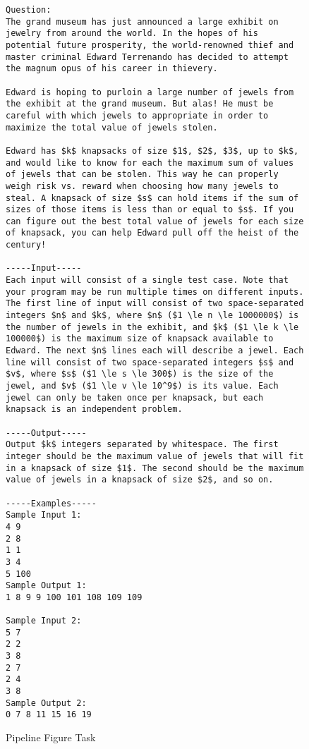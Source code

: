 \begin{figure}[h]
\begin{lstlisting}
Question:
The grand museum has just announced a large exhibit on jewelry from around the world. In the hopes of his potential future prosperity, the world-renowned thief and master criminal Edward Terrenando has decided to attempt the magnum opus of his career in thievery.

Edward is hoping to purloin a large number of jewels from the exhibit at the grand museum. But alas! He must be careful with which jewels to appropriate in order to maximize the total value of jewels stolen.

Edward has $k$ knapsacks of size $1$, $2$, $3$, up to $k$, and would like to know for each the maximum sum of values of jewels that can be stolen. This way he can properly weigh risk vs. reward when choosing how many jewels to steal. A knapsack of size $s$ can hold items if the sum of sizes of those items is less than or equal to $s$. If you can figure out the best total value of jewels for each size of knapsack, you can help Edward pull off the heist of the century!

-----Input-----
Each input will consist of a single test case. Note that your program may be run multiple times on different inputs. The first line of input will consist of two space-separated integers $n$ and $k$, where $n$ ($1 \le n \le 1000000$) is the number of jewels in the exhibit, and $k$ ($1 \le k \le 100000$) is the maximum size of knapsack available to Edward. The next $n$ lines each will describe a jewel. Each line will consist of two space-separated integers $s$ and $v$, where $s$ ($1 \le s \le 300$) is the size of the jewel, and $v$ ($1 \le v \le 10^9$) is its value. Each jewel can only be taken once per knapsack, but each knapsack is an independent problem.

-----Output-----
Output $k$ integers separated by whitespace. The first integer should be the maximum value of jewels that will fit in a knapsack of size $1$. The second should be the maximum value of jewels in a knapsack of size $2$, and so on.

-----Examples-----
Sample Input 1:
4 9
2 8
1 1
3 4
5 100
Sample Output 1:
1 8 9 9 100 101 108 109 109

Sample Input 2:
5 7
2 2
3 8
2 7
2 4
3 8
Sample Output 2:
0 7 8 11 15 16 19
\end{lstlisting}
\caption{Pipeline Figure Task}
\end{figure}


